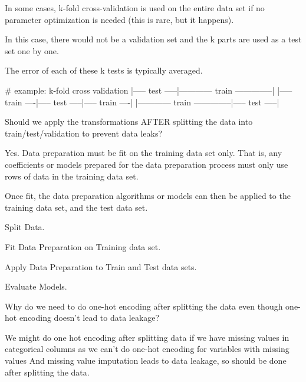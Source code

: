 \begin{qanda}
\begin{answer}
\begin{bulletedlist}
	\item In some cases, k-fold cross-validation is used on the entire data set if no parameter optimization is needed (this is rare, but it happens).
	\item In this case, there would not be a validation set and the k parts are used as a test set one by one.
	\item The error of each of these k tests is typically averaged.
\end{bulletedlist}
		\begin{code}[\codenumbering]{}
			\codeitemnonumber \# example: k-fold cross validation
			\codeitemnonumber
			\codeitemnonumber |----- test -----|------------ train --------------|
			\codeitemnonumber |----- train ----|----- test -----|----- train ----|
			\codeitemnonumber |------------ train --------------|----- test -----|
		\end{code}
		\end{answer}
	\end{qanda}

	\begin{qanda}
		\begin{question}
Should we apply the transformations AFTER splitting the data into train/test/validation to prevent data leaks?
		\end{question}

		\begin{answer}Yes. Data preparation must be fit on the training data set only. That is, any coefficients or models prepared for the data preparation process must only use rows of data in the training data set.

Once fit, the data preparation algorithms or models can then be applied to the training data set, and the test data set.
			\begin{numberedlist}
				\item Split Data.
				\item Fit Data Preparation on Training data set.
				\item Apply Data Preparation to Train and Test data sets.
				\item Evaluate Models.\end{numberedlist}\end{answer}\end{qanda}


	\begin{qanda}
		\begin{question}
Why do we need to do one-hot encoding after splitting the data even though one-hot encoding doesn't lead to data leakage?
		\end{question}

		\begin{answer}
We might do one hot encoding after splitting data if we have missing values in categorical columns as we can't do one-hot encoding for variables with missing values
And missing value imputation leads to data leakage, so should be done after splitting the data.
		\end{answer}
	\end{qanda}


